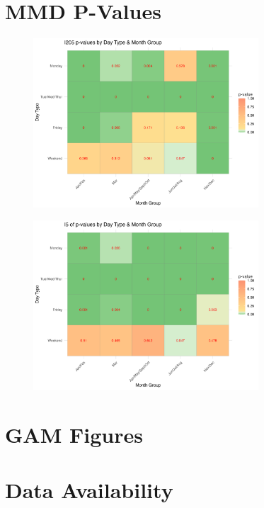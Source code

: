 \documentclass{article}
\begin{document}
\section{MMD P-Values}

\begin{figure}[H] 
    \centering
    \includegraphics[width=0.75\textwidth]{ATR26024_Plots/pvalues_A24.png}
    \label{fig:i205_pvalues}
\end{figure}

\begin{figure}[H] 
    \centering
    \includegraphics[width=0.75\textwidth]{ATR26004_Plots/pvalues_A04.png}
    \label{fig:i5_pvalues}
\end{figure}

\section{GAM Figures} \label{sec:gam_figs}



\section{Data Availability}
\end{document}
